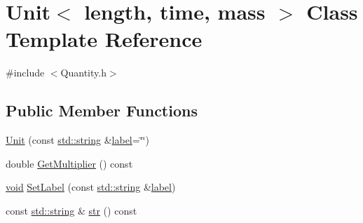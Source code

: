 \hypertarget{class_unit}{\section{Unit$<$ length, time, mass $>$ Class Template Reference}
\label{class_unit}
}


{\ttfamily \#include $<$Quantity.\+h$>$}

\subsection*{Public Member Functions}
\begin{DoxyCompactItemize}
\item 
\hyperlink{class_unit_a135a7f1e0f7e1163c4f4f312b45cdc83}{Unit} (const \hyperlink{glext_8h_ae84541b4f3d8e1ea24ec0f466a8c568b}{std\+::string} \&\hyperlink{glext_8h_a9371a1f53f8067997cd15aaf657c62d0}{label}=\char`\"{}\char`\"{})
\item 
double \hyperlink{class_unit_abc965c27239020bcaa506a923567ac4f}{Get\+Multiplier} () const 
\item 
\hyperlink{wglext_8h_a9e6b7f1933461ef318bb000d6bd13b83}{void} \hyperlink{class_unit_a7874709adb65fd349a7fc2511c2f843c}{Set\+Label} (const \hyperlink{glext_8h_ae84541b4f3d8e1ea24ec0f466a8c568b}{std\+::string} \&\hyperlink{glext_8h_a9371a1f53f8067997cd15aaf657c62d0}{label})
\item 
const \hyperlink{glext_8h_ae84541b4f3d8e1ea24ec0f466a8c568b}{std\+::string} \& \hyperlink{class_unit_ac4e0cec1f68ac214f1cc050501597899}{str} () const 
\end{DoxyCompactItemize}
